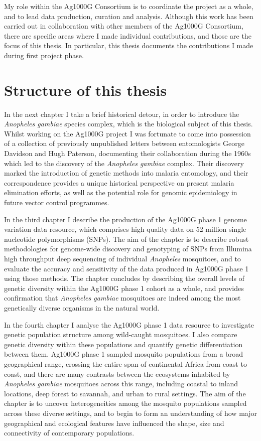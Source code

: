 \begin{refsection}
My role within the Ag1000G Consortium is to coordinate the project as a whole, and to lead data production, curation and analysis.
%
Although this work has been carried out in collaboration with other members of the Ag1000G Consortium, there are specific areas where I made individual contributions, and those are the focus of this thesis.
%
In particular, this thesis documents the contributions I made during first project phase.


\section{Structure of this thesis}\label{sec:structure}


In the next chapter I take a brief historical detour, in order to introduce the \textit{Anopheles gambiae} species complex, which is the biological subject of this thesis.
%
Whilst working on the Ag1000G project I was fortunate to come into possession of a collection of previously unpublished letters between entomologists George Davidson and Hugh Paterson, documenting their collaboration during the 1960s which led to the discovery of the \textit{Anopheles gambiae} complex.
%
Their discovery marked the introduction of genetic methods into malaria entomology, and their correspondence provides a unique historical perspective on present malaria elimination efforts, as well as the potential role for genomic epidemiology in future vector control programmes.

In the third chapter I describe the production of the Ag1000G phase 1 genome variation data resource, which comprises high quality data on 52 million single nucleotide polymorphisms (SNPs).
%
The aim of the chapter is to describe robust methodologies for genome-wide discovery and genotyping of SNPs from Illumina high throughput deep sequencing of individual \textit{Anopheles} mosquitoes, and to evaluate the accuracy and sensitivity of the data produced in Ag1000G phase 1 using those methods.
%
The chapter concludes by describing the overall levels of genetic diversity within the Ag1000G phase 1 cohort as a whole, and provides confirmation that \textit{Anopheles gambiae} mosquitoes are indeed among the most genetically diverse organisms in the natural world.


In the fourth chapter I analyse the Ag1000G phase 1 data resource to investigate genetic population structure among wild-caught mosquitoes.
%
I also compare genetic diversity within these populations and quantify genetic differentiation between them.
%
Ag1000G phase 1 sampled mosquito populations from a broad geographical range, crossing the entire span of continental Africa from coast to coast, and there are many contrasts between the ecosystems inhabited by \textit{Anopheles gambiae} mosquitoes across this range, including coastal to inland locations, deep forest to savannah, and urban to rural settings.
%
The aim of the chapter is to uncover heterogeneities among the mosquito populations sampled across these diverse settings, and to begin to form an understanding of how major geographical and ecological features have influenced the shape, size and connectivity of contemporary populations.



\end{refsection}
